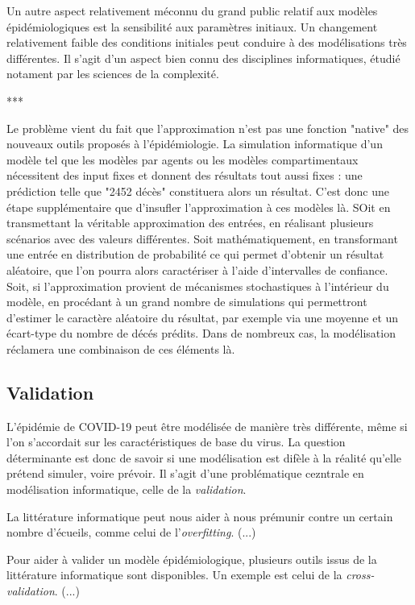 \documentclass[review]{elsarticle}
\begin{document}
Un autre aspect relativement méconnu du grand public relatif aux modèles épidémiologiques est la sensibilité aux paramètres initiaux. Un changement relativement faible des conditions initiales peut conduire à des modélisations très différentes. Il s'agit d'un aspect bien connu des disciplines informatiques, étudié notament par les sciences de la complexité. 

***

Le problème vient du fait que l'approximation n'est pas une fonction "native" des nouveaux outils proposés à l'épidémiologie. La simulation informatique d'un modèle tel que les modèles par agents ou les modèles compartimentaux nécessitent des input fixes et donnent des résultats tout aussi fixes : une prédiction telle que "2452 décès" constituera alors un résultat. C'est donc une étape supplémentaire que d'insufler l'approximation à ces modèles là. SOit en transmettant la véritable approximation des entrées, en réalisant plusieurs scénarios avec des valeurs différentes. Soit mathématiquement, en transformant une entrée en distribution de probabilité ce qui permet d'obtenir un résultat aléatoire, que l'on pourra alors caractériser à l'aide d'intervalles de confiance. Soit, si l'approximation provient de mécanismes stochastiques à l'intérieur du modèle, en procédant à un grand nombre de simulations qui permettront d'estimer le caractère aléatoire du résultat, par exemple via une moyenne et un écart-type du nombre de décés prédits. Dans de nombreux cas, la modélisation réclamera une combinaison de ces éléments là.

\subsection{Validation}

L'épidémie de COVID-19 peut être modélisée de manière très différente, même si l'on s'accordait sur les caractéristiques de base du virus. La question déterminante est donc de savoir si une modélisation est difèle à la réalité qu'elle prétend simuler, voire prévoir. Il s'agit d'une problématique cezntrale en modélisation informatique, celle de la \textit{validation}.

La littérature informatique peut nous aider à nous prémunir contre un certain nombre d'écueils, comme celui de l'\textit{overfitting}. (...)

Pour aider à valider un modèle épidémiologique, plusieurs outils issus de la littérature informatique sont disponibles. Un exemple est celui de la \textit{cross-validation}. (...)
\end{document}
